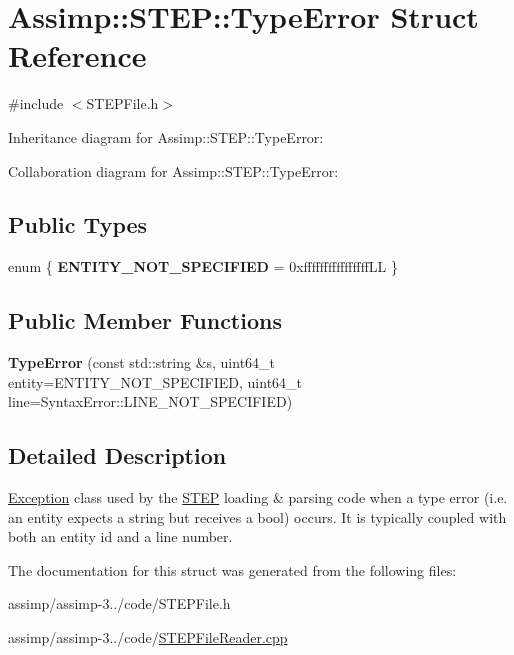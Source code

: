 \hypertarget{struct_assimp_1_1_s_t_e_p_1_1_type_error}{\section{Assimp\+:\+:S\+T\+E\+P\+:\+:Type\+Error Struct Reference}
\label{struct_assimp_1_1_s_t_e_p_1_1_type_error}
}


{\ttfamily \#include $<$S\+T\+E\+P\+File.\+h$>$}



Inheritance diagram for Assimp\+:\+:S\+T\+E\+P\+:\+:Type\+Error\+:


Collaboration diagram for Assimp\+:\+:S\+T\+E\+P\+:\+:Type\+Error\+:
\subsection*{Public Types}
\begin{DoxyCompactItemize}
\item 
\hypertarget{struct_assimp_1_1_s_t_e_p_1_1_type_error_a60673c8f5282ca4e165ffa23ba84b74c}{enum \{ {\bfseries E\+N\+T\+I\+T\+Y\+\_\+\+N\+O\+T\+\_\+\+S\+P\+E\+C\+I\+F\+I\+E\+D} = 0xffffffffffffffff\+L\+L
 \}}\label{struct_assimp_1_1_s_t_e_p_1_1_type_error_a60673c8f5282ca4e165ffa23ba84b74c}

\end{DoxyCompactItemize}
\subsection*{Public Member Functions}
\begin{DoxyCompactItemize}
\item 
\hypertarget{struct_assimp_1_1_s_t_e_p_1_1_type_error_abfa7159435c79f33720f662af60f76f3}{{\bfseries Type\+Error} (const std\+::string \&s, uint64\+\_\+t entity=E\+N\+T\+I\+T\+Y\+\_\+\+N\+O\+T\+\_\+\+S\+P\+E\+C\+I\+F\+I\+E\+D, uint64\+\_\+t line=Syntax\+Error\+::\+L\+I\+N\+E\+\_\+\+N\+O\+T\+\_\+\+S\+P\+E\+C\+I\+F\+I\+E\+D)}\label{struct_assimp_1_1_s_t_e_p_1_1_type_error_abfa7159435c79f33720f662af60f76f3}

\end{DoxyCompactItemize}


\subsection{Detailed Description}
\hyperlink{class_exception}{Exception} class used by the \hyperlink{namespace_assimp_1_1_s_t_e_p}{S\+T\+E\+P} loading \& parsing code when a type error (i.\+e. an entity expects a string but receives a bool) occurs. It is typically coupled with both an entity id and a line number. 

The documentation for this struct was generated from the following files\+:\begin{DoxyCompactItemize}
\item 
assimp/assimp-\/3../code/S\+T\+E\+P\+File.\+h\item 
assimp/assimp-\/3../code/\hyperlink{_s_t_e_p_file_reader_8cpp}{S\+T\+E\+P\+File\+Reader.\+cpp}\end{DoxyCompactItemize}
